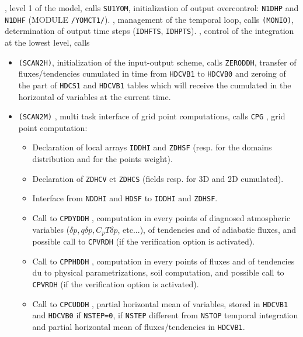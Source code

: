 , level 1 of the model, calls {\tt SU1YOM}, initialization of output overcontrol: {\tt N1DHP} and  {\tt N1DHF} (MODULE {\tt /YOMCT1/}).
\newline{}, management of the temporal loop, calls {\tt (MONIO)}, determination of output time steps ({\tt IDHFTS}, {\tt IDHPTS}).
\newline{}, control of the integration at the lowest level, calls
\begin{itemize}
	\item {\tt (SCAN2H)}, initialization of the input-output scheme, calls {\tt ZERODDH}, transfer of fluxes/tendencies cumulated in time from {\tt HDCVB1} to {\tt HDCVB0} and zeroing of the part of {\tt HDCS1} and {\tt HDCVB1} tables which will receive the cumulated in the horizontal of variables at the current time.
        \item {\tt (SCAN2M)} , multi task interface of grid point computations, calls {\tt CPG} , grid point computation:
            \begin{itemize}
                  \item Declaration of local arrays {\tt IDDHI} and {\tt ZDHSF} (resp. for the domains distribution and for the points weight).
                  \item Declaration of {\tt ZDHCV} et {\tt ZDHCS} (fields resp. for 3D and 2D cumulated).
                  \item Interface from {\tt NDDHI} and {\tt HDSF} to {\tt IDDHI} and {\tt ZDHSF}.
                  \item Call to {\tt CPDYDDH}  , computation in every points of diagnosed atmospheric variables ($\delta p, q\delta p, C_{p}T\delta p$, etc...), of tendencies and of adiabatic fluxes, and possible call to {\tt CPVRDH} (if the verification option is activated).
                  \item Call to {\tt CPPHDDH}  , computation in every points of fluxes and of tendencies du to physical parametrizations, soil computation, and possible call to {\tt CPVRDH} (if the verification option is activated). 
                  \item Call to {\tt CPCUDDH}  , partial horizontal mean of variables, stored in {\tt HDCVB1} and {\tt HDCVB0} if {\tt NSTEP=0}, if {\tt NSTEP} different from {\tt NSTOP} temporal integration and partial horizontal mean of fluxes/tendencies in {\tt HDCVB1}.
            \end{itemize}

\end{itemize}
